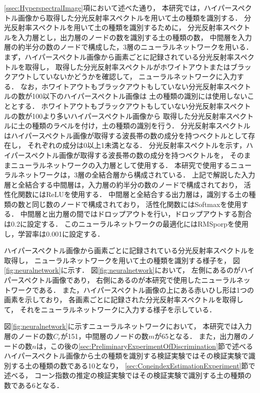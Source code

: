 \ref{ssec:HyperspectralImage}項において述べた通り，
本研究では，ハイパースペクトル画像から取得した分光反射率スペクトルを用いて土の種類を識別する．
分光反射率スペクトルを用いて土の種類を識別するために，
分光反射率スペクトルを入力層とし，出力層のノードの数を識別する土の種類の数，
中間層を入力層の約半分の数のノードで構成した，3層のニューラルネットワークを用いる．
まず，ハイパースペクトル画像から画素ごとに記録されている分光反射率スペクトルを取得し，
取得した分光反射率スペクトルがホワイトアウトまたはブラックアウトしていないかどうかを確認して，
ニューラルネットワークに入力する．
なお，ホワイトアウトもブラックアウトもしていない分光反射率スペクトルの数が100以下のハイパースペクトル画像は
土の種類の識別には使用しないこととする．
ホワイトアウトもブラックアウトもしていない分光反射率スペクトルの数が100より多いハイパースペクトル画像から
取得した分光反射率スペクトルに土の種類のラベルを付け，土の種類の識別を行う．
分光反射率スペクトルはハイパースペクトル画像が取得する波長帯の数の成分を持つベクトルとして存在し，
それぞれの成分は0以上1未満となる．
分光反射率スペクトルを示す，ハイパースペクトル画像が取得する波長帯の数の成分を持つベクトルを，
そのままニューラルネットワークの入力層として使用する．
本研究で使用するニューラルネットワークは，3層の全結合層から構成されている．
上記で解説した入力層と全結合する中間層は，入力層の約半分の数のノードで構成されており，
活性化関数にはReLUを使用する．
中間層と全結合する出力層は，識別する土の種類の数と同じ数のノードで構成されており，
活性化関数にはSoftmaxを使用する．
中間層と出力層の間ではドロップアウトを行い，ドロップアウトする割合は0.2に設定する．
このニューラルネットワークの最適化にはRMSporpを使用し，学習率は0.001に設定する．

ハイパースペクトル画像から画素ごとに記録されている分光反射率スペクトルを取得し，
ニューラルネットワークを用いて土の種類を識別する様子を，
図\ref{fig:neuralnetwork}に示す．
図\ref{fig:neuralnetwork}において，
左側にあるのがハイパースペクトル画像であり，
右側にあるのが本研究で使用したニューラルネットワークである．
また，ハイパースペクトル画像の上にある赤いひし形は1つの画素を示しており，
各画素ごとに記録された分光反射率スペクトルを取得して，
それをニューラルネットワークに入力する様子を示している．

図\ref{fig:neuralnetwork}に示すニューラルネットワークにおいて，
本研究では入力層のノードの数$C_r$が151，中間層のノードの数$m$が65となる．
また，出力層のノードの数$n$は，この後の\ref{sec:PreliminaryExperimentOfDiscrimination}節で述べる
ハイパースペクトル画像から土の種類を識別する検証実験ではその検証実験で識別する土の種類の数である10となり，
\ref{sec:ConeindexEstimationExperiment}節で述べる，
コーン指数の推定の検証実験ではその検証実験で識別する土の種類の数である6となる．



